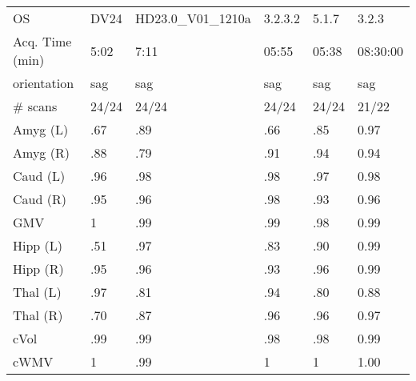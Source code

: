 \begin{table}
\begin{tabular}{llllll}
OS                    &                      DV24 &            HD23.0\_V01\_1210a &               3.2.3.2 &              5.1.7 &                3.2.3 \\
Acq. Time (min)       &               5:02 &  7:11 &              05:55 &           05:38 &             08:30:00 \\
orientation           &               sag &                         sag &                   sag &                sag &                  sag \\
\# scans & 24/24 & 24/24 & 24/24 & 24/24 & 21/22 \\
\midrule
Amyg (L)              &                   .67 &                        .89 &                  .66 &               .85 &                 0.97 \\
Amyg (R)              &                   .88 &                        .79 &                  .91 &               .94 &                 0.94 \\
Caud (L)              &                   .96 &                        .98 &                  .98 &               .97 &                 0.98 \\
Caud (R)              &                   .95 &                        .96 &                  .98 &               .93 &                 0.96 \\
GMV                   &                   1 &                        .99 &                  .99 &               .98 &                 0.99 \\
Hipp (L)              &                   .51 &                        .97 &                  .83 &               .90 &                 0.99 \\
Hipp (R)              &                   .95 &                        .96 &                  .93 &               .96 &                 0.99 \\
Thal (L)              &                   .97 &                        .81 &                  .94 &               .80 &                 0.88 \\
Thal (R)              &                   .70 &                        .87 &                  .96 &               .96 &                 0.97 \\
cVol                  &                   .99 &                        .99 &                  .98 &               .98 &                 0.99 \\
cWMV                  &                   1 &                        .99 &                  1 &               1 &                 1.00 \\

\end{tabular}
\end{table}

